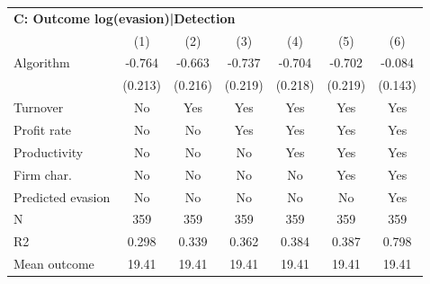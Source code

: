 \begin{tabular}{lcccccc}
\midrule \multicolumn{7}{l}{\textbf{C: Outcome log(evasion)|Detection}} \\ \multicolumn{1}{l}{} & (1) & (2) & (3) & (4) & (5) & (6) \\ \midrule
Algorithm   &      -0.764\sym{***}&      -0.663\sym{***}&      -0.737\sym{***}&      -0.704\sym{***}&      -0.702\sym{***}&      -0.084         \\
            &     (0.213)         &     (0.216)         &     (0.219)         &     (0.218)         &     (0.219)         &     (0.143)         \\
\midrule
Turnover    &          No         &         Yes         &         Yes         &         Yes         &         Yes         &         Yes         \\
Profit rate &          No         &          No         &         Yes         &         Yes         &         Yes         &         Yes         \\
Productivity&          No         &          No         &          No         &         Yes         &         Yes         &         Yes         \\
Firm char.  &          No         &          No         &          No         &          No         &         Yes         &         Yes         \\
Predicted evasion&          No         &          No         &          No         &          No         &          No         &         Yes         \\
N           &         359         &         359         &         359         &         359         &         359         &         359         \\
R2          &       0.298         &       0.339         &       0.362         &       0.384         &       0.387         &       0.798         \\
Mean outcome&       19.41         &       19.41         &       19.41         &       19.41         &       19.41         &       19.41         \\
\bottomrule \end{tabular}
